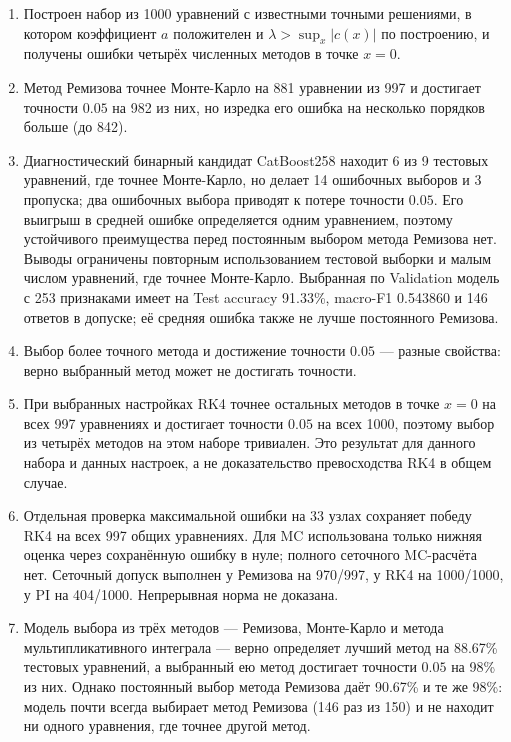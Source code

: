 \documentclass[14pt,a4paper]{extarticle}
\begin{document}
\begin{enumerate}
\item Построен набор из 1000 уравнений с известными точными решениями,
в котором коэффициент $a$ положителен и $\lambda>\sup_x|c(x)|$
по построению, и получены ошибки четырёх численных методов в точке
$x=0$.
\item Метод Ремизова точнее Монте-Карло на 881 уравнении из 997
и достигает точности $0.05$ на 982 из них, но изредка его ошибка
на несколько порядков больше (до 842).
\item Диагностический бинарный кандидат CatBoost258 находит
6 из 9 тестовых уравнений, где точнее
Монте-Карло, но делает 14 ошибочных выборов и 3 пропуска; два ошибочных
выбора приводят к потере точности $0.05$. Его выигрыш в средней ошибке
определяется одним уравнением, поэтому устойчивого преимущества перед
постоянным выбором метода Ремизова нет. Выводы ограничены повторным
использованием тестовой выборки и малым числом уравнений, где точнее
Монте-Карло. Выбранная по Validation модель с 253 признаками
имеет на Test accuracy 91.33\%, macro-F1 0.543860 и 146 ответов
в допуске; её средняя ошибка также не лучше постоянного Ремизова.
\item Выбор более точного метода и достижение точности $0.05$ ---
разные свойства: верно выбранный метод может не достигать точности.
\item При выбранных настройках RK4 точнее остальных методов в точке
$x=0$ на всех 997 уравнениях и достигает точности $0.05$ на всех 1000,
поэтому выбор из четырёх методов на этом наборе тривиален. Это результат
для данного набора и данных настроек, а не доказательство превосходства
RK4 в общем случае.
\item Отдельная проверка максимальной ошибки на 33 узлах сохраняет
победу RK4 на всех 997 общих уравнениях. Для MC использована только
нижняя оценка через сохранённую ошибку в нуле; полного сеточного
MC-расчёта нет. Сеточный допуск выполнен у Ремизова на 970/997,
у RK4 на 1000/1000, у PI на 404/1000. Непрерывная норма не доказана.
\item Модель выбора из трёх методов --- Ремизова, Монте-Карло и метода
мультипликативного интеграла --- верно определяет лучший метод
на 88.67\% тестовых уравнений, а выбранный ею метод достигает точности $0.05$
на 98\% из них. Однако постоянный выбор метода Ремизова даёт 90.67\%
и те же 98\%: модель почти всегда выбирает метод Ремизова (146 раз
из 150) и не находит ни одного уравнения, где точнее другой метод.


\end{enumerate}
\end{document}

